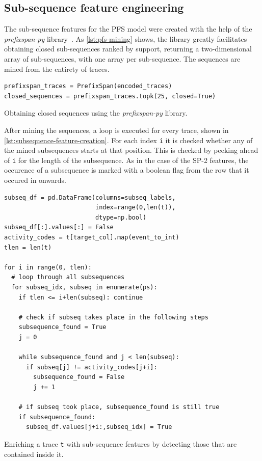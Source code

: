 \subsection*{Sub-sequence feature engineering}
The sub-sequence features for the PFS model were created with the help of the \textit{prefixspan-py} library~\cite{web:prefixspan-py}. As \autoref{lst:pfs-mining} shows, the library greatly facilitates obtaining closed sub-sequences ranked by support, returning a two-dimensional array of sub-sequences, with one array per sub-sequence. The sequences are mined from the entirety of traces.

\begin{listing}[ht]
\begin{verbatim}
prefixspan_traces = PrefixSpan(encoded_traces)
closed_sequences = prefixspan_traces.topk(25, closed=True)
\end{verbatim}
\caption{Obtaining closed sequences using the \textit{prefixspan-py} library.}
\label{lst:pfs-mining}
\end{listing}

After mining the sequences, a loop is executed for every trace, shown in \autoref{lst:subsequence-feature-creation}. For each index \verb=i= it is checked whether any of the mined subsequences starts at that position. This is checked by peeking ahead of \verb=i= for the length of the subsequence. As in the case of the SP-2 features, the occurence of a subsequence is marked with a boolean flag from the row that it occured in onwards.

\begin{listing}[ht]
\begin{verbatim}
subseq_df = pd.DataFrame(columns=subseq_labels,
                         index=range(0,len(t)),
                         dtype=np.bool)
subseq_df[:].values[:] = False
activity_codes = t[target_col].map(event_to_int)
tlen = len(t)

for i in range(0, tlen):
  # loop through all subsequences
  for subseq_idx, subseq in enumerate(ps):
    if tlen <= i+len(subseq): continue
            
    # check if subseq takes place in the following steps
    subsequence_found = True
    j = 0
    
    while subsequence_found and j < len(subseq):
      if subseq[j] != activity_codes[j+i]:
        subsequence_found = False
        j += 1

    # if subseq took place, subsequence_found is still true
    if subsequence_found:
      subseq_df.values[j+i:,subseq_idx] = True
\end{verbatim}
\caption{Enriching a trace \texttt{t} with sub-sequence features by detecting those that are contained inside it.}
\label{lst:subsequence-feature-creation}
\end{listing}

